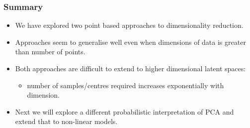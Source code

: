 
\begin{frame}
  \frametitle{Summary}
  \begin{itemize}
  \item We have explored two point based approaches to dimensionality reduction.
  \item Approaches seem to generalise well even when dimensions of data is
    greater than number of points.
  \item Both approaches are difficult to extend to higher dimensional latent
    spaces:

    \begin{itemize}
    \item number of samples/centres required increases exponentially with dimension.
    \end{itemize}
  \item Next we will explore a different probabilistic interpretation of PCA
    and extend that to non-linear models.
  \end{itemize}


\end{frame}
